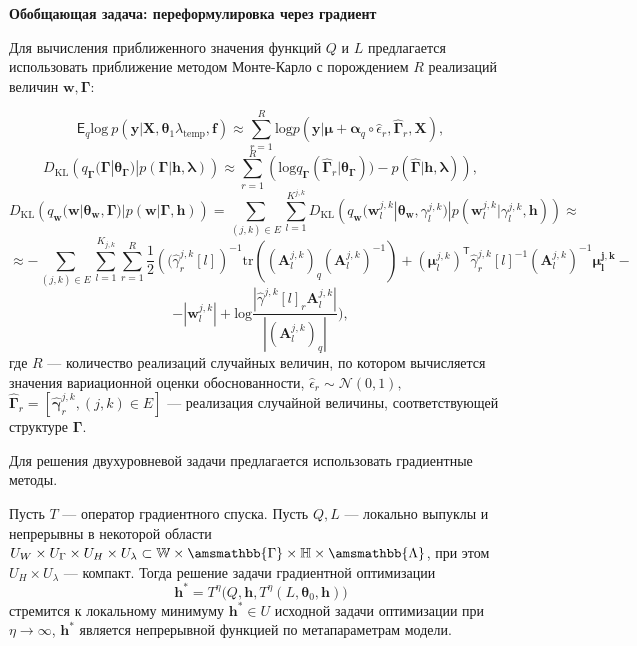 \textbf{Обобщающая задача: переформулировка через градиент}



Для вычисления приближенного значения функций $Q$ и $L$ предлагается использовать приближение методом Монте-Карло с порождением $R$ реализаций величин $\mathbf{w}, \boldsymbol{\Gamma}$:

\[
   \mathsf{E}_q \text{log}~p(\mathbf{y}|\mathbf{X}, \boldsymbol{\theta}_1 \lambda_{\text{temp}}, \mathbf{f}) \approx   \sum_{r=1}^R \text{log}p(\mathbf{y}|\boldsymbol{\mu}+\boldsymbol{\alpha}_q \circ \hat{\epsilon}_r, \hat{\boldsymbol{\Gamma}}_r, \mathbf{X}),
\]
\[
D_\text{KL}\left(q_{\boldsymbol{\Gamma}}(\boldsymbol{\Gamma}|\boldsymbol{\theta}_{\boldsymbol{\Gamma}})|p(\boldsymbol{\Gamma}|\mathbf{h}, \boldsymbol{\lambda})\right)   \approx  \sum_{r=1}^R \left(\text{log}q_{\boldsymbol{\Gamma}}(\hat{\boldsymbol{\Gamma}}_r|\boldsymbol{\theta}_{\boldsymbol{\Gamma}}))-p(\hat{\boldsymbol{\Gamma}}|\mathbf{h},\boldsymbol{\lambda})\right),
\]
\[
D_\text{KL}\left(q_{\mathbf{w}}(\mathbf{w}|\boldsymbol{\theta}_\mathbf{w},\boldsymbol{\Gamma})|p(\mathbf{w}|\boldsymbol{\Gamma}, \mathbf{h})\right)  =  \sum_{(j,k) \in E}\sum_{l=1}^{K^{j,k}} D_\text{KL}\left(q_{\mathbf{w}}(\mathbf{w}^{j,k}_l|\boldsymbol{\theta}_\mathbf{w},\gamma^{j,k}_l)|p(\mathbf{w}^{j,k}_l|\gamma^{j,k}_l, \mathbf{h})\right)\approx
\]
\[ 
\approx-\sum_{(j,k) \in E}\sum_{l=1}^{K_{j,k}}\sum_{r=1}^R\frac{1}{2}\left( (\hat{\gamma}^{j,k}_r[l]\right)^{-1}\text{tr}((\mathbf{A}^{j,k}_l)_q(\mathbf{A}^{j,k}_l)^{-1})+(\boldsymbol{\mu}^{j,k}_l)^{\mathsf{T}}\hat{\gamma}^{j,k}_r[l]^{-1}(\mathbf{A}^{j,k}_l)^{-1}\boldsymbol{\mu^{j,k}_l} -
\]
\[
- |\mathbf{w}^{j,k}_l|+\text{log}\frac{|\hat{\gamma}^{j,k}[l]_r\mathbf{A}^{j,k}_l|}{|(\mathbf{A}^{j,k}_l)_q|}),
\]
где $R$ --- количество реализаций случайных величин, по котором вычисляется значения вариационной оценки обоснованности, $\hat{\epsilon}_r \sim \mathcal{N}(0,1),$
 $\hat{\boldsymbol{\Gamma}}_r = [\hat{\boldsymbol{\gamma}}^{j,k}_r, (j,k) \in E]$ --- реализация случайной величины, соответствующей структуре $\boldsymbol{\Gamma}$.

Для решения двухуровневой задачи предлагается использовать градиентные методы. 
\begin{theorem}
Пусть $T$ --- оператор градиентного спуска.
Пусть $Q,L$ --- локально выпуклы и непрерывны в некоторой области $U_{W} \times U_{\Gamma} \times U_H \times U_\lambda \subset \mathbb{W}\times\amsmathbb{\Gamma}\times\mathbb{H}\times\amsmathbb{\Lambda}$, при  этом $U_H \times U_\lambda$ --- компакт. 
Тогда решение задачи градиентной оптимизации 
\[
     \mathbf{h}^{*} = T^\eta\bigl(Q, \mathbf{h}, T^\eta(L, \boldsymbol{\theta}_0, \mathbf{h})\bigr)
\] 
стремится к локальному минимуму  $\mathbf{h}^{*} \in U$ исходной задачи оптимизации при $\eta \to \infty$,
$\mathbf{h}^{*}$ является непрерывной функцией по метапараметрам модели.
\end{theorem}

